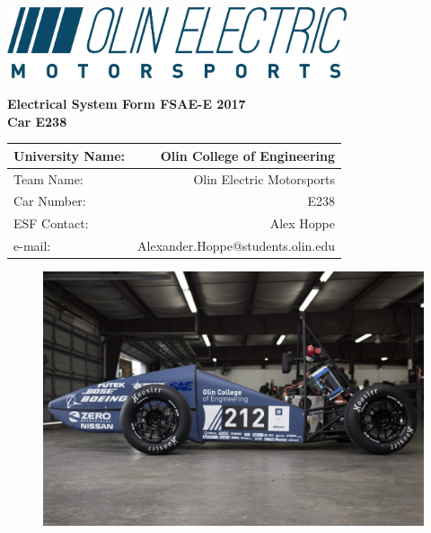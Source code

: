 \documentclass{article}
\begin{document}
\renewcommand{\headrulewidth}{0pt}
\chead{}
\rhead{} %
{}
\rfoot{\thepage}

\begin{titlepage}

    \centering
    \vfill
    \includegraphics[width=10cm]{logo_blue.png}

    {\bfseries\Large
        \vskip3cm
        Electrical System Form FSAE-E 2017\\
        Car E238\\
    }

    \begin{table}[H]
        \centering
        \label{my-label}
        \begin{tabular}{lr}
        University Name: & Olin College of Engineering \\ \hline
        Team Name: & Olin Electric Motorsports \\ \hline
        Car Number: & E238 \\ \hline
        ESF Contact: & Alex Hoppe \\ \hline
        e-mail: & Alexander.Hoppe@students.olin.edu \\ \hline
        \end{tabular}
    \end{table}
\vfill

\begin{figure}[H]
\centering
\includegraphics[width = 0.9 \textwidth]{mk1}
\end{figure}

\end{titlepage}
\end{document}
